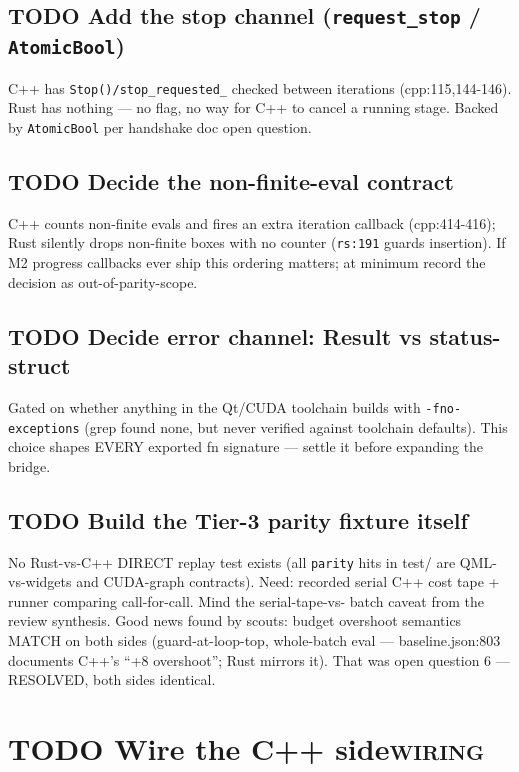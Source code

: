 \documentclass[11pt]{article}
\begin{document}
\subsection{{\bfseries\sffamily TODO} Add the stop channel (\texttt{request\_stop} / \texttt{AtomicBool})}
\label{sec:orgbbffbf0}
C++ has \texttt{Stop()/stop\_requested\_} checked between iterations
(cpp:115,144-146). Rust has nothing — no flag, no way for C++ to cancel
a running stage. Backed by \texttt{AtomicBool} per handshake doc open question.
\subsection{{\bfseries\sffamily TODO} Decide the non-finite-eval contract}
\label{sec:org5b375e3}
C++ counts non-finite evals and fires an extra iteration callback
(cpp:414-416); Rust silently drops non-finite boxes with no counter
(\texttt{rs:191} guards insertion). If M2 progress callbacks ever ship this
ordering matters; at minimum record the decision as out-of-parity-scope.
\subsection{{\bfseries\sffamily TODO} Decide error channel: Result vs status-struct}
\label{sec:org0a71e84}
Gated on whether anything in the Qt/CUDA toolchain builds with
\texttt{-fno-exceptions} (grep found none, but never verified against toolchain
defaults). This choice shapes EVERY exported fn signature — settle it
before expanding the bridge.
\subsection{{\bfseries\sffamily TODO} Build the Tier-3 parity fixture itself}
\label{sec:org5ed3510}
No Rust-vs-C++ DIRECT replay test exists (all \texttt{parity} hits in test/
are QML-vs-widgets and CUDA-graph contracts). Need: recorded serial C++
cost tape + runner comparing call-for-call. Mind the serial-tape-vs-
batch caveat from the review synthesis. Good news found by scouts: budget
overshoot semantics MATCH on both sides (guard-at-loop-top, whole-batch
eval — baseline.json:803 documents C++'s ``+8 overshoot''; Rust mirrors
it). That was open question 6 — RESOLVED, both sides identical.
\section{{\bfseries\sffamily TODO} Wire the C++ side\hfill{}\textsc{wiring}}
\label{sec:orgf8a5fbf}
\end{document}
